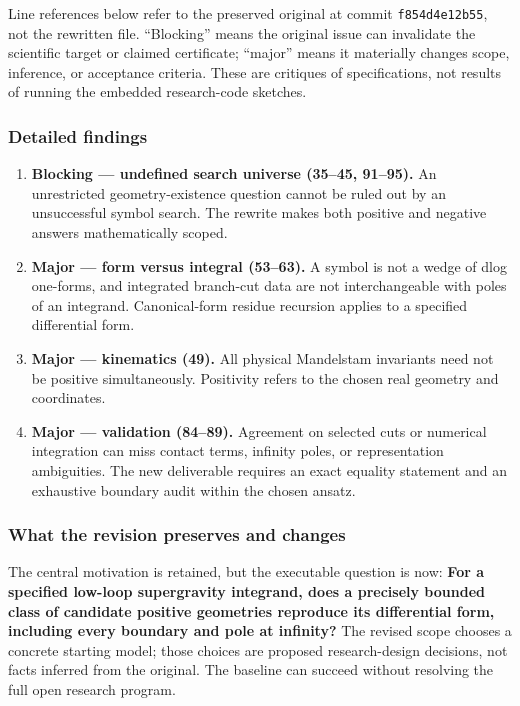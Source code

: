 \documentclass[
  11pt,
]{article}
\begin{document}
Line references below refer to the preserved original at commit
\texttt{f854d4e12b55}, not the rewritten file. ``Blocking'' means the
original issue can invalidate the scientific target or claimed
certificate; ``major'' means it materially changes scope, inference, or
acceptance criteria. These are critiques of specifications, not results
of running the embedded research-code sketches.

\subsubsection{Detailed findings}

\begin{enumerate}
\def\labelenumi{\arabic{enumi}.}
\item
  \textbf{Blocking --- undefined search universe (35--45, 91--95).} An
  unrestricted geometry-existence question cannot be ruled out by an
  unsuccessful symbol search. The rewrite makes both positive and
  negative answers mathematically scoped.
\item
  \textbf{Major --- form versus integral (53--63).} A symbol is not a
  wedge of dlog one-forms, and integrated branch-cut data are not
  interchangeable with poles of an integrand. Canonical-form residue
  recursion applies to a specified differential form.
\item
  \textbf{Major --- kinematics (49).} All physical Mandelstam invariants
  need not be positive simultaneously. Positivity refers to the chosen
  real geometry and coordinates.
\item
  \textbf{Major --- validation (84--89).} Agreement on selected cuts or
  numerical integration can miss contact terms, infinity poles, or
  representation ambiguities. The new deliverable requires an exact
  equality statement and an exhaustive boundary audit within the chosen
  ansatz.
\end{enumerate}

\subsubsection{What the revision preserves and changes}

The central motivation is retained, but the executable question is now:
\textbf{For a specified low-loop supergravity integrand, does a
precisely bounded class of candidate positive geometries reproduce its
differential form, including every boundary and pole at infinity?} The
revised scope chooses a concrete starting model; those choices are
proposed research-design decisions, not facts inferred from the
original. The baseline can succeed without resolving the full open
research program.
\end{document}
